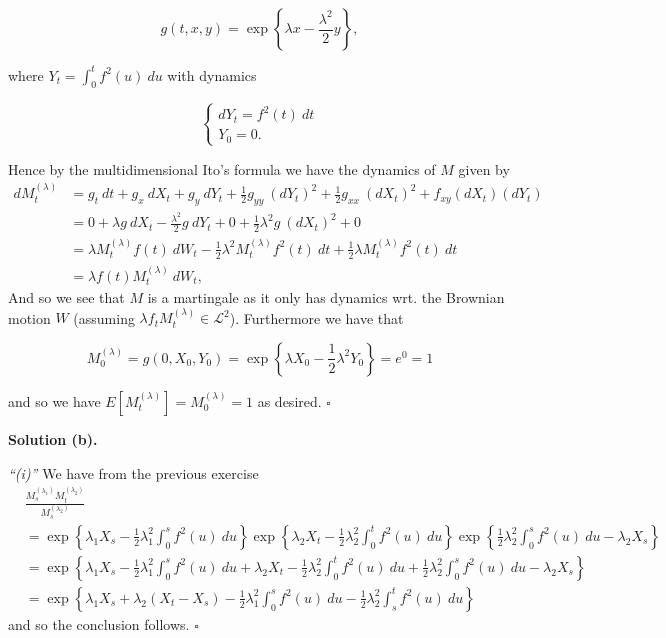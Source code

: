 \documentclass[a4paper,12pt,openany]{book}
\begin{document}
\[
g(t,x,y)=\exp\left\{\lambda x-\frac{\lambda^2}{2}y \right\},
\]

where \(Y_t=\int_0^t f^2(u)\ du\) with dynamics

\[
\begin{cases}
dY_t=f^2(t)\ dt\\
Y_0=0.
\end{cases}
\]

Hence by the multidimensional Ito's formula we have the dynamics of \(M\) given by
\begin{align*}
dM^{(\lambda)}_t&=g_t\ dt+g_x\ dX_t+g_y\ dY_t+\frac{1}{2}g_{yy}\ (dY_t)^2+\frac{1}{2}g_{xx}\ (dX_t)^2 +f_{xy}(dX_t)(dY_t)\\
&=0+\lambda g\ dX_t-\frac{\lambda^2}{2}g\ dY_t+0+\frac{1}{2}\lambda ^2g\ (dX_t)^2+0\\
&=\lambda M_t^{(\lambda)} f(t)\ dW_t-\frac{1}{2}\lambda^2M_t^{(\lambda)} f^2(t)\ dt+\frac{1}{2}\lambda M_t^{(\lambda)} f^2(t)\ dt\\
&=\lambda f(t)M_t^{(\lambda)}\ dW_t,
\end{align*}
And so we see that \(M\) is a martingale as it only has dynamics wrt. the Brownian motion \(W\) (assuming \(\lambda f_tM_t^{(\lambda)}\in\mathcal{L}^2\)). Furthermore we have that

\[
M_0^{(\lambda)}=g(0,X_0,Y_0)=\exp\left\{\lambda X_0-\frac{1}{2}\lambda ^2 Y_0\right\}=e^0=1
\]

and so we have \(E[M_t^{(\lambda)}]=M_0^{(\lambda)}=1\) as desired. \(\square\)

\noindent\makebox[\linewidth]{\rule{\textwidth}{0.4pt}}

\textbf{Solution (b).}

\emph{``(i)''} We have from the previous exercise
\begin{align*}
&\frac{M^{(\lambda_1)}_sM^{(\lambda_2)}_t}{M^{(\lambda_2)}_s}\\
&=\exp\left\{\lambda_1 X_s-\frac{1}{2}\lambda_1^2\int_0^s f^2(u)\ du\right\}\exp\left\{\lambda_2 X_t-\frac{1}{2}\lambda_2^2\int_0^t f^2(u)\ du\right\}\exp\left\{\frac{1}{2}\lambda_2^2\int_0^s f^2(u)\ du-\lambda_2 X_s\right\}\\
&=\exp\left\{\lambda_1 X_s-\frac{1}{2}\lambda_1^2\int_0^s f^2(u)\ du+\lambda_2 X_t-\frac{1}{2}\lambda_2^2\int_0^t f^2(u)\ du+\frac{1}{2}\lambda_2^2\int_0^s f^2(u)\ du-\lambda_2 X_s\right\}\\
&=\exp\left\{\lambda_1 X_s+\lambda_2 (X_t-X_s)-\frac{1}{2}\lambda_1^2\int_0^s f^2(u)\ du-\frac{1}{2}\lambda_2^2\int_s^t f^2(u)\ du\right\}
\end{align*}
and so the conclusion follows. \(\square\)
\end{document}
